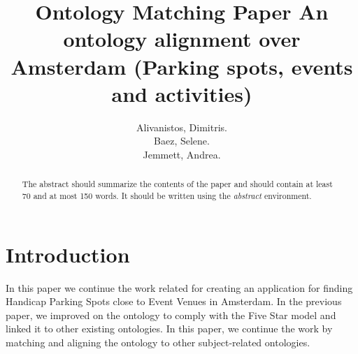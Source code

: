 \documentclass[runningheads,a4paper]{../../StyleFiles/llncs}
\begin{document}
\mainmatter  %

\title{Ontology Matching Paper An ontology alignment over Amsterdam (Parking spots, events and activities)}


%
%
\author{Alivanistos, Dimitris. \\ Baez, Selene. \\ Jemmett, Andrea.}
%


\maketitle


\begin{abstract}
The abstract should summarize the contents of the paper and should
contain at least 70 and at most 150 words. It should be written using the
\emph{abstract} environment.
\end{abstract}


\section{Introduction}
In this paper we continue the work related for creating an application for finding Handicap Parking Spots close to Event Venues in Amsterdam. In the previous paper, we improved on the ontology to comply with the Five Star model and linked it to other existing ontologies. In this paper, we continue the work by matching and aligning the ontology to other subject-related ontologies. 
\end{document}
